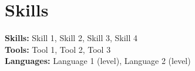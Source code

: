 \section{Skills}

\begin{itemize}[leftmargin=0.15in, label={}]
    \small{\item{
        \textbf{Skills:} Skill 1, Skill 2, Skill 3, Skill 4 \\
        \textbf{Tools:} Tool 1, Tool 2, Tool 3 \\
        \textbf{Languages:} Language 1 (level), Language 2 (level)
    }}
\end{itemize}
